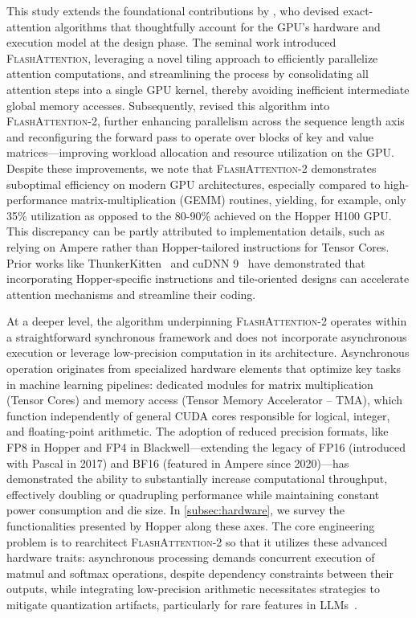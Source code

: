 This study extends the foundational contributions by \citet{dao2022flashattention}, who devised exact-attention algorithms that thoughtfully account for the GPU’s hardware and execution model at the design phase. The seminal work \citep{dao2022flashattention} introduced \textsc{FlashAttention}, leveraging a novel tiling approach to efficiently parallelize attention computations, and streamlining the process by consolidating all attention steps into a single GPU kernel, thereby avoiding inefficient intermediate global memory accesses. Subsequently, \citet{dao2023flashattention2} revised this algorithm into \textsc{FlashAttention-2}, further enhancing parallelism across the sequence length axis and reconfiguring the forward pass to operate over blocks of key and value matrices—improving workload allocation and resource utilization on the GPU. Despite these improvements, we note that \textsc{FlashAttention-2} demonstrates suboptimal efficiency on modern GPU architectures, especially compared to high-performance matrix-multiplication (GEMM) routines, yielding, for example, only 35\% utilization as opposed to the 80-90\% achieved on the Hopper H100 GPU. This discrepancy can be partly attributed to implementation details, such as relying on Ampere rather than Hopper-tailored instructions for Tensor Cores. Prior works like ThunkerKitten~\citep{spector2024thunder} and cuDNN 9~\citep{cudnn9} have demonstrated that incorporating Hopper-specific instructions and tile-oriented designs can accelerate attention mechanisms and streamline their coding.

At a deeper level, the algorithm underpinning \textsc{FlashAttention-2} operates within a straightforward synchronous framework and does not incorporate asynchronous execution or leverage low-precision computation in its architecture. Asynchronous operation originates from specialized hardware elements that optimize key tasks in machine learning pipelines: dedicated modules for matrix multiplication (Tensor Cores) and memory access (Tensor Memory Accelerator -- TMA), which function independently of general CUDA cores responsible for logical, integer, and floating-point arithmetic. The adoption of reduced precision formats, like FP8 in Hopper and FP4 in Blackwell—extending the legacy of FP16 (introduced with Pascal in 2017) and BF16 (featured in Ampere since 2020)—has demonstrated the ability to substantially increase computational throughput, effectively doubling or quadrupling performance while maintaining constant power consumption and die size. In \cref{subsec:hardware}, we survey the functionalities presented by Hopper along these axes. 
The core engineering problem is to rearchitect \textsc{FlashAttention-2} so that it utilizes these advanced hardware traits: asynchronous processing demands concurrent execution of matmul and softmax operations, despite dependency constraints between their outputs, while integrating low-precision arithmetic necessitates strategies to mitigate quantization artifacts, particularly for rare features in LLMs~\citep{dettmers2208llm, sun2024massive}.

